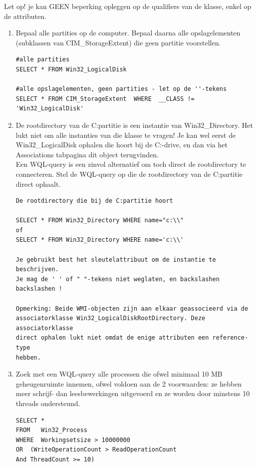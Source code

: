 \documentclass[11pt,a4paper]{report}
\begin{document}
Let op! je kan GEEN beperking opleggen op de qualifiers van de klasse, enkel op de attributen.
\begin{enumerate}[resume]
	\item Bepaal alle partities op de computer.
	Bepaal daarna alle opslagelementen (subklassen van CIM\_StorageExtent) die geen partitie voorstellen.
	\begin{lstlisting}
#alle partities
SELECT * FROM Win32_LogicalDisk

#alle opslagelementen, geen partities - let op de ''-tekens
SELECT * FROM CIM_StorageExtent  WHERE  __CLASS != 'Win32_LogicalDisk'
	\end{lstlisting}
	\item De rootdirectory van de C:partitie is een instantie van Win32\_Directory. Het lukt niet om alle instanties van die klasse te vragen! Je kan wel eerst de Win32\_LogicalDisk ophalen die hoort bij de C:-drive, en dan via het Associations tabpagina dit object terugvinden.\\
	Een WQL-query is een zinvol alternatief om toch direct de rootdirectory te connecteren. Stel de WQL-query op die de rootdirectory van de C:partitie direct ophaalt.
	\begin{lstlisting}
De rootdirectory die bij de C:partitie hoort

SELECT * FROM Win32_Directory WHERE name="c:\\"
of
SELECT * FROM Win32_Directory WHERE name='c:\\'

Je gebruikt best het sleutelattribuut om de instantie te beschrijven. 
Je mag de ' ' of " "-tekens niet weglaten, en backslashen backslashen !

Opmerking: Beide WMI-objecten zijn aan elkaar geassocieerd via de 
associatorklasse Win32_LogicalDiskRootDirectory. Deze associatorklasse 
direct ophalen lukt niet omdat de enige attributen een reference-type 
hebben.
	\end{lstlisting}
	\item Zoek met een WQL-query alle processen die ofwel minimaal 10 MB geheugenruimte innemen, ofwel voldoen aan de 2 voorwaarden: ze hebben meer schrijf- dan leesbewerkingen uitgevoerd en ze worden door minstens 10 threads ondersteund.
	\begin{lstlisting}
SELECT *
FROM   Win32_Process
WHERE  Workingsetsize > 10000000
OR  (WriteOperationCount > ReadOperationCount
And ThreadCount >= 10)


\end{lstlisting}
\end{enumerate}
\end{document}
